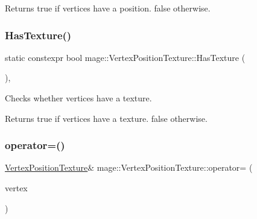 \begin{DoxyReturn}{Returns}
{\ttfamily true} if vertices have a position. {\ttfamily false} otherwise. 
\end{DoxyReturn}
\hypertarget{structmage_1_1_vertex_position_texture_a8812d80a2f933fdbea33cfd356245c2d}{}\label{structmage_1_1_vertex_position_texture_a8812d80a2f933fdbea33cfd356245c2d} 
\subsubsection{\texorpdfstring{Has\+Texture()}{HasTexture()}}
{\footnotesize\ttfamily static constexpr bool mage\+::\+Vertex\+Position\+Texture\+::\+Has\+Texture (\begin{DoxyParamCaption}{ }\end{DoxyParamCaption})\hspace{0.3cm}{\ttfamily [static]}, {\ttfamily [noexcept]}}

Checks whether vertices have a texture.

\begin{DoxyReturn}{Returns}
{\ttfamily true} if vertices have a texture. {\ttfamily false} otherwise. 
\end{DoxyReturn}
\hypertarget{structmage_1_1_vertex_position_texture_adae15e832eaf7624c32865a11d0d8234}{}\label{structmage_1_1_vertex_position_texture_adae15e832eaf7624c32865a11d0d8234} 
\subsubsection{\texorpdfstring{operator=()}{operator=()}\hspace{0.1cm}{\footnotesize\ttfamily [1/2]}}
{\footnotesize\ttfamily \hyperlink{structmage_1_1_vertex_position_texture}{Vertex\+Position\+Texture}\& mage\+::\+Vertex\+Position\+Texture\+::operator= (\begin{DoxyParamCaption}\item[{const \hyperlink{structmage_1_1_vertex_position_texture}{Vertex\+Position\+Texture} \&}]{vertex }\end{DoxyParamCaption})\hspace{0.3cm}{\ttfamily [default]}}

